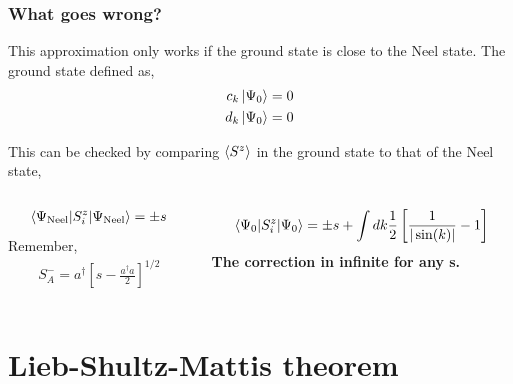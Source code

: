 \documentclass{beamer}
\begin{document}
\begin{frame}
    \frametitle{What goes wrong?}
    \pause
    This approximation only works if the ground state is close to the Neel state.
    The ground state defined as,
    \begin{align*}
        c_k \ket{\Psi_0} = 0 \nonumber \\ 
        d_k \ket{\Psi_0} = 0
    \end{align*}
    \pause 

    This can be checked by comparing $\braket{S^z}$ in the ground state to that of the Neel state, 
    \begin{columns}[T]
    \begin{column}{0.35\textwidth}
        \begin{align*}
            \braket{\Psi_{\text{Neel}}|S^z_i|\Psi_{\text{Neel}}} = \pm s
        \end{align*}
        Remember, 
        \begin{align*}
        S^-_A = a^\dagger \left[ s-\frac{a^\dagger a}{2} \right]^{1/2} 
        \end{align*}
    \end{column}
    \begin{column}{0.65\textwidth}
        \begin{align*}
            \braket{\Psi_0|S^z_i|\Psi_0} = \pm s + \int dk \frac{1}{2} \left[  \frac{1}{|\sin(k)|} - 1\right] 
        \end{align*}
        \alert{\textbf{The correction in infinite for any s.}}
    \end{column}
    \end{columns}
    
\end{frame}

\section{Lieb-Shultz-Mattis theorem}
\end{document}
